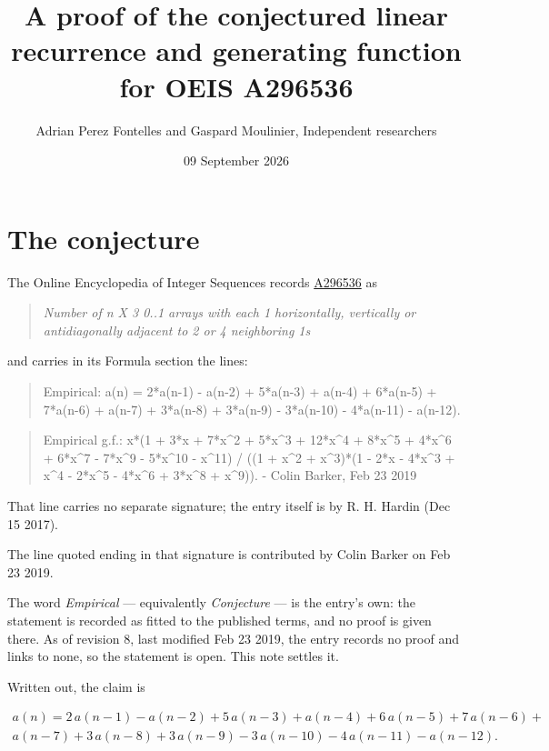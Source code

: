 \documentclass[11pt]{article}
\title{A proof of the conjectured linear recurrence and generating function for OEIS A296536}
\author{Adrian Perez Fontelles and Gaspard Moulinier, Independent researchers}
\date{09 September 2026}
\theoremstyle{definition}
\begin{document}
\maketitle
\section{The conjecture}

The Online Encyclopedia of Integer Sequences records \href{https://oeis.org/A296536}{A296536} as

\begin{quote}\itshape Number of n X 3 0..1 arrays with each 1 horizontally, vertically or antidiagonally adjacent to 2 or 4 neighboring 1s\end{quote}

and carries in its Formula section the lines:

\begin{quote}\ttfamily Empirical: a(n) = 2*a(n-1) - a(n-2) + 5*a(n-3) + a(n-4) + 6*a(n-5) + 7*a(n-6) + a(n-7) + 3*a(n-8) + 3*a(n-9) - 3*a(n-10) - 4*a(n-11) - a(n-12).\end{quote}

\begin{quote}\ttfamily Empirical g.f.: x*(1 + 3*x + 7*x\textasciicircum{}2 + 5*x\textasciicircum{}3 + 12*x\textasciicircum{}4 + 8*x\textasciicircum{}5 + 4*x\textasciicircum{}6 + 6*x\textasciicircum{}7 - 7*x\textasciicircum{}9 - 5*x\textasciicircum{}10 - x\textasciicircum{}11) / ((1 + x\textasciicircum{}2 + x\textasciicircum{}3)*(1 - 2*x - 4*x\textasciicircum{}3 + x\textasciicircum{}4 - 2*x\textasciicircum{}5 - 4*x\textasciicircum{}6 + 3*x\textasciicircum{}8 + x\textasciicircum{}9)). - Colin Barker, Feb 23 2019\end{quote}

That line carries no separate signature; the entry itself is by R. H. Hardin (Dec 15 2017).

The line quoted ending in that signature is contributed by Colin Barker on Feb 23 2019.

The word {\itshape Empirical} --- equivalently {\itshape Conjecture} --- is the entry's own: the statement is recorded as fitted to the published terms, and no proof is given there. As of revision 8, last modified Feb 23 2019, the entry records no proof and links to none, so the statement is open. This note settles it.

Written out, the claim is

\begin{multline*} a(n) = 2\,a(n-1) - a(n-2) + 5\,a(n-3) + a(n-4) + 6\,a(n-5) + 7\,a(n-6) + \\ a(n-7) + 3\,a(n-8) + 3\,a(n-9) - 3\,a(n-10) - 4\,a(n-11) - a(n-12). \end{multline*}
\end{document}
